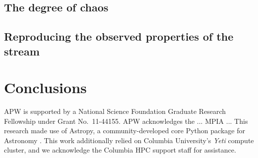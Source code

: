 \documentclass[letterpaper,12pt,preprint]{aastex}
\begin{document}
\subsection{The degree of chaos}\label{sec:results1}

\subsection{Reproducing the observed properties of the stream}\label{sec:results2}

\section{Conclusions}\label{sec:conclusions}

\acknowledgements
APW is supported by a National Science Foundation Graduate Research Fellowship under Grant No.\ 11-44155.
APW acknowledges the ... MPIA ...
This research made use of Astropy, a community-developed core Python package for Astronomy \citep{astropy13}.
This work additionally relied on Columbia University's \emph{Yeti} compute cluster, and we acknowledge the Columbia HPC support staff for assistance. \\

%
%
\end{document}
